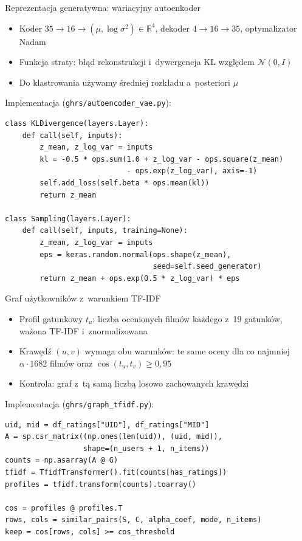 \documentclass[red]{beamer}
\begin{document}
    \begin{frame}[fragile]{Reprezentacja generatywna: wariacyjny autoenkoder}
        \footnotesize
        \begin{itemize}
            \item Koder $35 \rightarrow 16 \rightarrow (\mu, \log\sigma^2) \in \mathbb{R}^4$,
                  dekoder $4 \rightarrow 16 \rightarrow 35$, optymalizator Nadam
            \item Funkcja straty: błąd rekonstrukcji i~dywergencja KL względem $\mathcal{N}(0, I)$
            \item Do klastrowania używamy średniej rozkładu a~posteriori $\mu$
        \end{itemize}
        Implementacja (\texttt{ghrs/autoencoder\_vae.py}):
\begin{lstlisting}
class KLDivergence(layers.Layer):
    def call(self, inputs):
        z_mean, z_log_var = inputs
        kl = -0.5 * ops.sum(1.0 + z_log_var - ops.square(z_mean)
                            - ops.exp(z_log_var), axis=-1)
        self.add_loss(self.beta * ops.mean(kl))
        return z_mean

class Sampling(layers.Layer):
    def call(self, inputs, training=None):
        z_mean, z_log_var = inputs
        eps = keras.random.normal(ops.shape(z_mean),
                                  seed=self.seed_generator)
        return z_mean + ops.exp(0.5 * z_log_var) * eps
\end{lstlisting}
    \end{frame}

    \begin{frame}[fragile]{Graf użytkowników z~warunkiem TF-IDF}
        \footnotesize
        \begin{itemize}
            \item Profil gatunkowy $t_u$: liczba ocenionych filmów każdego z~19 gatunków,
                  ważona TF-IDF i~znormalizowana
            \item Krawędź $(u, v)$ wymaga obu warunków: te same oceny dla co najmniej
                  $\alpha \cdot 1682$ filmów oraz $\cos(t_u, t_v) \geq 0{,}95$
            \item Kontrola: graf z~tą samą liczbą losowo zachowanych krawędzi
        \end{itemize}
        Implementacja (\texttt{ghrs/graph\_tfidf.py}):
\begin{lstlisting}
uid, mid = df_ratings["UID"], df_ratings["MID"]
A = sp.csr_matrix((np.ones(len(uid)), (uid, mid)),
                  shape=(n_users + 1, n_items))
counts = np.asarray(A @ G)
tfidf = TfidfTransformer().fit(counts[has_ratings])
profiles = tfidf.transform(counts).toarray()

cos = profiles @ profiles.T
rows, cols = similar_pairs(S, C, alpha_coef, mode, n_items)
keep = cos[rows, cols] >= cos_threshold
\end{lstlisting}
    \end{frame}
\end{document}
